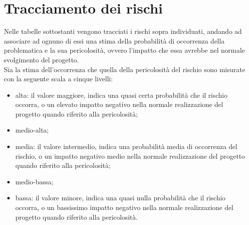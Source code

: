 \section{Tracciamento dei rischi}
Nelle tabelle sottostanti vengono tracciati i rischi sopra individuati, andando ad associare ad ognuno di essi una stima della probabilità di occorrenza della problematica e la sua pericolosità, ovvero l'impatto che essa avrebbe nel normale svolgimento del progetto.\\
Sia la stima dell'occorrenza che quella della pericolosità del rischio sono misurate con la seguente scala a cinque livelli:
\begin{itemize}
    \item alta: il valore maggiore, indica una quasi certa probabilità che il rischio occorra, o un elevato impatto negativo nella normale realizzazione del progetto quando riferito alla pericolosità;
    \item medio-alta;
    \item media: il valore intermedio, indica una probabilità media di occorrenza del rischio, o un impatto negativo medio nella normale realizzazione del progetto quando riferito alla pericolosità;
    \item medio-bassa;
    \item bassa: il valore minore, indica una quasi nulla probabilità che il rischio occorra, o un bassissimo impatto negativo nella normale realizzazione del progetto quando riferito alla pericolosità.
\end{itemize}

